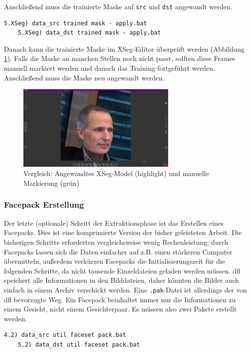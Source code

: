 Anschließend muss die trainierte Maske auf \texttt{src} und \texttt{dst} angewandt werden.
\begin{lstlisting}[numbers=none,label={lst:xseg-apply}]
    5.XSeg) data_src trained mask - apply.bat
    5.XSeg) data_dst trained mask - apply.bat
\end{lstlisting}
Danach kann die trainierte Maske im XSeg-Editor überprüft werden (Abbildung \ref{fig:xseg-train-comparison}).
Falls die Maske an manchen Stellen noch nicht passt, sollten diese Frames manuell markiert werden und danach das Training fortgeführt werden.
Anschließend muss die Maske neu angewandt werden.

\begin{figure}
    \center
    \includegraphics[width=0.7\textwidth]{Bilder/DFL/XSegEditor-6-trained-draw-comparision}
    \caption{Vergleich: Angewandtes XSeg-Model (highlight) und manuelle Markierung (grün)}
    \label{fig:xseg-train-comparison}
\end{figure}

\subsubsection*{Facepack Erstellung}
Der letzte (optionale) Schritt der Extraktionsphase ist das Erstellen eines Facepacks.
Dies ist eine komprimierte Version der bisher geleisteten Arbeit.
Die bisherigen Schritte erforderten vergleichsweise wenig Rechenleistung; durch Facepacks lassen sich die Daten einfacher auf z.B. einen stärkeren Computer übermitteln, außerdem verkürzen Facepacks die Initialisierungszeit für die folgenden Schritte, da nicht tausende Einzeldateien geladen werden müssen.
\gls{dfl} speichert alle Informationen in den Bilddateien, daher könnten die Bilder auch einfach in einem Archiv verschickt werden.
Eine \texttt{.pak}-Datei ist allerdings der von \gls{dfl} bevorzugte Weg.
Ein Facepack beinhaltet immer nur die Informationen zu einem Gesicht, nicht einem Gesichterpaar.
Es müssen also zwei Pakete erstellt werden.
\begin{lstlisting}[numbers=none,label={lst:facepack}]
    4.2) data_src util faceset pack.bat
    5.2) data_dst util faceset pack.bat
\end{lstlisting}
